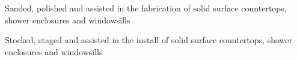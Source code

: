 \begin{job}

  \item Sanded, polished and assisted in the fabrication of solid surface
    countertops, shower enclosures and windowsills
  \item Stocked, staged and assisted in the install of solid surface
    countertops, shower enclosures and windowsills
\end{job}
